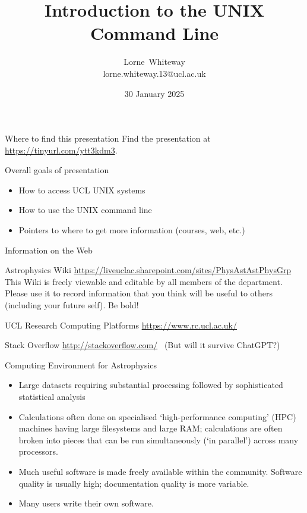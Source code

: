 \documentclass{beamer}
\title{Introduction to the UNIX Command Line}
\author{Lorne~Whiteway \\ lorne.whiteway.13@ucl.ac.uk}
\institute[UCL]
{
  Astrophysics Group\\
  Department of Physics and Astronomy\\
  University College London
}
\date
{30 January 2025}
\begin{document}
\frame{\titlepage}

\begin{frame}{Where to find this presentation}
    Find the presentation at \alert{\url{https://tinyurl.com/ytt3kdm3}}.\\
\end{frame}


\begin{frame}{Overall goals of presentation}
  \begin{itemize}
    \item How to access UCL UNIX systems
    \item How to use the UNIX command line
    \item Pointers to where to get more information (courses, web, etc.)
  \end{itemize}
\end{frame}


\begin{frame}{Information on the Web}
  \begin{block}{Astrophysics Wiki}
    \url{https://liveuclac.sharepoint.com/sites/PhysAstAstPhysGrp}
    This Wiki is freely viewable and editable by all members of the department. Please use it to record information that you think will be useful to others (including your future self). Be bold!
  \end{block}
  \begin{block}{UCL Research Computing Platforms}
    \url{https://www.rc.ucl.ac.uk/}
  \end{block}
  \begin{block}{Stack Overflow}
    \url{http://stackoverflow.com/}  \ (But will it survive ChatGPT?)
  \end{block}
\end{frame}


\begin{frame}{Computing Environment for Astrophysics}
  \begin{itemize}
  \item Large datasets requiring substantial processing followed by sophisticated statistical analysis
  \item Calculations often done on specialised `high-performance computing' (HPC) machines having large filesystems and large RAM; calculations are often broken into pieces that can be run simultaneously (`in parallel') across many processors.
  \item Much useful software is made freely available within the community. Software quality is usually high; documentation quality is more variable.
  \item Many users write their own software.
  \end{itemize}
\end{frame}
\end{document}
